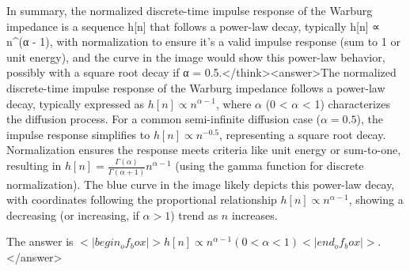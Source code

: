 In summary, the normalized discrete-time impulse response of the Warburg impedance is a sequence h[n] that follows a power-law decay, typically h[n] ∝ n^(α - 1), with normalization to ensure it's a valid impulse response (sum to 1 or unit energy), and the curve in the image would show this power-law behavior, possibly with a square root decay if α = 0.5.</think><answer>The normalized discrete-time impulse response of the Warburg impedance follows a power-law decay, typically expressed as \( h[n] \propto n^{\alpha - 1} \), where \( \alpha \) (0 < \( \alpha \) < 1) characterizes the diffusion process. For a common semi-infinite diffusion case (\( \alpha = 0.5 \)), the impulse response simplifies to \( h[n] \propto n^{-0.5} \), representing a square root decay. Normalization ensures the response meets criteria like unit energy or sum-to-one, resulting in \( h[n] = \frac{\Gamma(\alpha)}{\Gamma(\alpha + 1)} n^{\alpha - 1} \) (using the gamma function for discrete normalization). The blue curve in the image likely depicts this power-law decay, with coordinates following the proportional relationship \( h[n] \propto n^{\alpha - 1} \), showing a decreasing (or increasing, if \( \alpha > 1 \)) trend as \( n \) increases.  

The answer is \(<|begin_of_box|>h[n] \propto n^{\alpha - 1} (0 < \alpha < 1)<|end_of_box|>\).</answer>